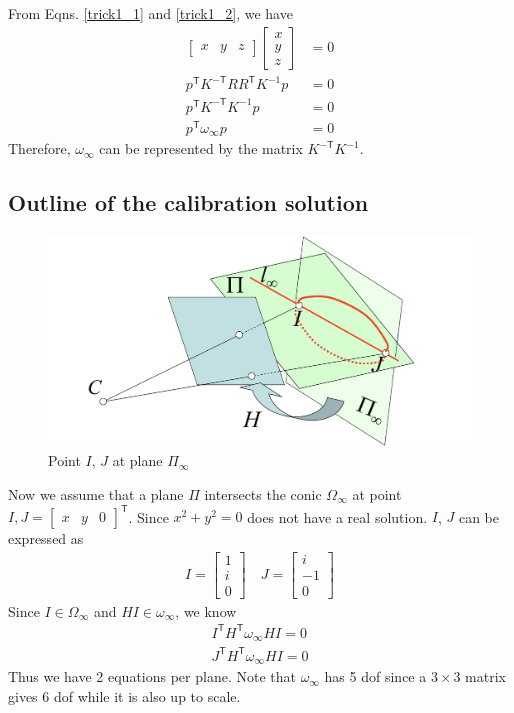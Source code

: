 \documentclass[11pt]{article}
\begin{document}
From Eqns. \ref{trick1_1} and \ref{trick1_2}, we have
\begin{align}
\left[\begin{array}{ccc}x & y & z\end{array}\right]\left[\begin{array}{c}x \\ y \\ z\end{array}\right]&=0 \nonumber\\
p^\mathsf{T} K^{-\mathsf{T}}RR^\mathsf{T} K^{-1}p&=0 \nonumber\\
p^\mathsf{T} K^{-\mathsf{T}}K^{-1}p&=0 \nonumber\\
p^\mathsf{T} \omega_\infty p&=0
\end{align}
Therefore, $\omega_\infty$ can be represented by the matrix $K^{-\mathsf{T}}K^{-1}$.

\subsection{Outline of the calibration solution}
\begin{figure}[H]
\begin{center}
\includegraphics[width=10 cm]{images/plane_at_inf.png}
\caption{Point $I$, $J$ at plane $\Pi_\infty$}
\label{plane_at_inf}
\end{center}
\end{figure}
Now we assume that a plane $\Pi$ intersects the conic $\Omega_\infty$ at point $I,J=\left[\begin{array}{ccc}x & y & 0\end{array}\right]^\mathsf{T}$. Since $x^2+y^2=0$ does not have a real solution. $I$, $J$ can be expressed as 
\begin{align}
I = \left[\begin{array}{c}1 \\ i \\ 0\end{array}\right] \quad J = \left[\begin{array}{c}i \\ -1 \\ 0\end{array}\right]
\end{align}
Since $I\in\Omega_\infty$ and $HI\in\omega_\infty$, we know
\begin{align*}
I^\mathsf{T} H^\mathsf{T}\omega_\infty HI=0\\
J^\mathsf{T} H^\mathsf{T}\omega_\infty HI=0
\end{align*}
Thus we have 2 equations per plane. Note that $\omega_\infty$ has 5 dof since a $3\times3$ matrix gives 6 dof while it is also up to scale. 
\end{document}
